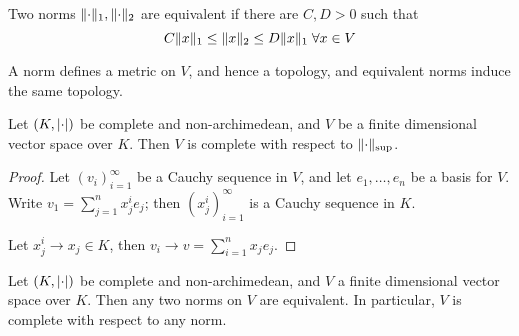 \documentclass[10pt,a4paper]{article}
\begin{document}
\begin{definition}
  Two norms $\lVert\cdot\rVert_1, \lVert\cdot\rVert_2$ are equivalent if there are $C, D > 0$ such that
  \[C\norm{x}_1 \leq \norm{x}_2 \leq D \norm{x}_1 \forall x \in V\]
\end{definition}
A norm defines a metric on $V$, and hence a topology, and equivalent norms induce the same topology.
\begin{proposition}
  Let $(K,\lvert\cdot\rvert)$ be complete and non-archimedean, and $V$ be a finite dimensional vector space over $K$. Then $V$ is complete with respect to $\lVert\cdot\rVert_{\sup}$.
\end{proposition}
\begin{proof}
  Let $(v_i)_{i=1}^\infty$ be a Cauchy sequence in $V$, and let $e_1, \ldots, e_n$ be a basis for $V$. Write $v_1 = \sum_{j=1}^n x_j^i e_j$; then $(x_j^i)_{i=1}^\infty$ is a Cauchy sequence in $K$.

  Let $x_j^i \to x_j \in K$, then $v_i \to v=\sum_{i=1}^n x_j e_j$.
\end{proof}
\begin{theorem}
  Let $(K,\lvert\cdot\rvert)$ be complete and non-archimedean, and $V$ a finite dimensional vector space over $K$. Then any two norms on $V$ are equivalent. In particular, $V$ is complete with respect to any norm.
\end{theorem}
\end{document}
